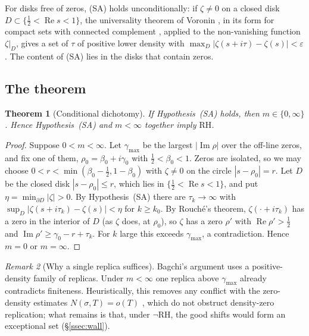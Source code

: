\documentclass[11pt]{amsart}
\newtheorem{theorem}{Theorem}[section]
\theoremstyle{definition}
\theoremstyle{remark}
\newtheorem{remark}[theorem]{Remark}
\newcommand{\RH}{\mathrm{RH}}
\DeclareMathOperator{\Real}{Re}
\DeclareMathOperator{\Imag}{Im}
\begin{document}
For disks free of zeros, (SA) holds unconditionally: if $\zeta\ne0$ on a
closed disk $D\subset\{\tfrac12<\Real s<1\}$, the universality theorem of Voronin
\cite{Voronin75}, in its form for compact sets with connected complement
\cite[Thm.~1.9]{Steuding}, applied to the non-vanishing function $\zeta|_D$, gives a
set of $\tau$ of positive lower density with
$\max_D|\zeta(s+i\tau)-\zeta(s)|<\varepsilon$. The content of (SA) lies in
the disks that contain zeros.

\subsection{The theorem}
\begin{theorem}[Conditional dichotomy]
\label{thm:dichotomy}
If Hypothesis~(SA) holds, then $m\in\{0,\infty\}$. Hence Hypothesis~(SA)
and $m<\infty$ together imply $\RH$.
\end{theorem}

\begin{proof}
Suppose $0<m<\infty$. Let $\gamma_{\max}$ be the largest $|\Imag\rho|$ over
the off-line zeros, and fix one of them, $\rho_0=\beta_0+i\gamma_0$ with
$\tfrac12<\beta_0<1$. Zeros are isolated, so we may choose
$0<r<\min(\beta_0-\tfrac12,1-\beta_0)$ with $\zeta\ne0$ on the circle
$|s-\rho_0|=r$. Let $D$ be the closed disk $|s-\rho_0|\le r$, which lies in
$\{\tfrac12<\Real s<1\}$, and put $\eta=\min_{\partial D}|\zeta|>0$. By
Hypothesis~(SA) there are $\tau_k\to\infty$ with
$\sup_D|\zeta(s+i\tau_k)-\zeta(s)|<\eta$ for $k\ge k_0$. By Rouch\'e's
theorem, $\zeta(\cdot+i\tau_k)$ has a zero in the interior of $D$ (as
$\zeta$ does, at $\rho_0$), so $\zeta$ has a zero $\rho'$ with
$\Real\rho'>\tfrac12$ and $\Imag\rho'\ge\gamma_0-r+\tau_k$. For $k$ large
this exceeds $\gamma_{\max}$, a contradiction. Hence $m=0$ or $m=\infty$.
\end{proof}

\begin{remark}[Why a single replica suffices]
Bagchi's argument \cite{Bagchi87} uses a positive-density family of
replicas. Under $m<\infty$ one replica above $\gamma_{\max}$ already
contradicts finiteness. Heuristically, this removes any conflict with the
zero-density estimates $N(\sigma,T)=o(T)$ \cite[Thm.~9.17]{Titchmarsh}, which do not obstruct
density-zero replication; what remains is that, under $\neg\RH$, the good
shifts would form an exceptional set (\S\ref{ssec:wall}).
\end{remark}
\end{document}
